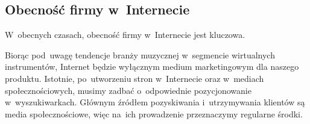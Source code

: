 \documentclass[12pt]{article}
\begin{document}




\subsection{Obecność firmy w~Internecie} %


W~obecnych czasach, obecność firmy w~Internecie jest kluczowa.

Biorąc pod~uwagę tendencje branży muzycznej w~segmencie wirtualnych instrumentów, Internet będzie wyłącznym medium marketingowym dla naszego produktu.
Istotnie, po~utworzeniu stron w~Internecie oraz w~mediach społecznościowych, musimy zadbać o~odpowiednie pozycjonowanie w~wyszukiwarkach.
Głównym źródłem pozyskiwania i~utrzymywania klientów są media społecznościowe, więc na~ich prowadzenie przeznaczymy regularne środki.
\end{document}
